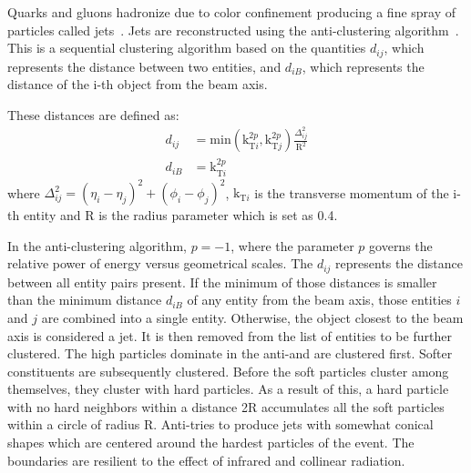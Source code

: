 Quarks and gluons hadronize due to color confinement producing a fine spray of particles called jets~\cite{Cacciari:2008gp}. Jets are reconstructed using the anti-\kt clustering algorithm~\cite{Cacciari:2011ma}. This is a sequential clustering algorithm based on the quantities $d_{ij}$, which represents the distance between two entities, and $d_{iB}$, which represents the distance of the i-th object from the beam axis.

These distances are defined as:
\begin{equation}
  \begin{aligned}
  d_{ij}&= \text{min}(\text{k}_{\text{T}i}^{2p},\text{k}_{\text{T}j}^{2p})\frac{\Delta_{ij}^{2}}{\text{R}^2} \\
  d_{iB}&=\text{k}_{\text{T}i}^{2p}
  \end{aligned}
\end{equation}
where $\Delta_{ij}^{2}=(\eta_i-\eta_j)^2+(\phi_i-\phi_j)^2$, $\text{k}_{\text{T}i}$ is the transverse momentum of the i-th entity and R is the radius parameter which is set as 0.4.

In the anti-\kt clustering algorithm, $p=-1$, where the parameter $p$ governs the relative power of energy versus geometrical scales. The $d_{ij}$ represents the distance between all entity pairs present. If the minimum of those distances is smaller than the minimum distance $d_{iB}$ of any entity from the beam axis, those entities $i$ and $j$ are combined into a single entity. Otherwise, the object closest to the beam axis is considered a jet. It is then removed from the list of entities to be further clustered. The high \pt particles dominate in the anti-\kt and are clustered first. Softer constituents are subsequently clustered. Before the soft particles cluster among themselves, they cluster with hard particles. As a result of this, a hard particle with no hard neighbors within a distance 2R accumulates all the soft particles within a circle of radius R. Anti-\kt tries to produce jets with somewhat conical shapes which are centered around the hardest particles of the event. The boundaries are resilient to the effect of infrared and collinear radiation.

